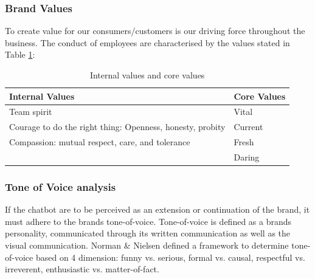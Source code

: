 \vspace{2,5mm}

        \subsubsection{Brand Values}
        
        To create value for our consumers/customers is our driving force throughout the business. The conduct of employees are characterised by the values stated in Table \ref{table:1}:
        
    \begin{table}[h]
    \begin{tabular}{ |p{9cm}||p{}|  }
     \hline
     Internal Values & Core Values \\
     \hline
        Team spirit & Vital \\
        Courage to do the right thing: Openness, honesty, probity & Current\\
        Compassion: mutual respect, care, and tolerance & Fresh \\
        & Daring    \\
     \hline
    \end{tabular}
    \caption{Internal values and core values}
    \label{table:1}
    \end{table}

        \subsubsection{Tone of Voice analysis}
    
        If the chatbot are to be perceived as an extension or continuation of the brand, it must adhere to the brands tone-of-voice. Tone-of-voice is defined as a brands personality, communicated through its written communication as well as the visual communication. Norman \& Nielsen defined a framework to determine tone-of-voice based on 4 dimension: funny vs. serious, formal vs. causal, respectful vs. irreverent, enthusiastic vs. matter-of-fact.
    
